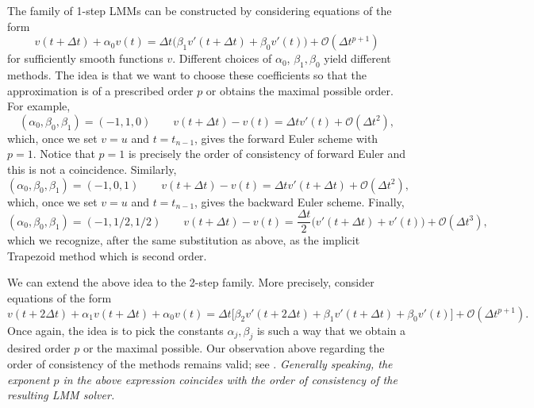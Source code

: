 The family of 1-step LMMs can be constructed by 
considering equations of the form 
\begin{equation*}
    v(t + \Delta t) + \alpha_0 v(t) 
    = \Delta t \Big( \beta_1 v'(t + \Delta t) + \beta_0 v'(t) \Big) 
    + \mathcal{O}(\Delta t^{p+1})
\end{equation*}
for sufficiently smooth functions $v$. Different choices of $\alpha_0$, 
$\beta_1, \beta_0$ yield different methods. The idea is that 
we want to choose these coefficients so that the approximation 
is of a prescribed order $p$ or obtains the maximal possible 
order. For example,
\begin{equation*}
    (\alpha_0, \beta_0, \beta_1) = (-1, 1, 0) \qquad 
    v(t + \Delta t) - v(t) = \Delta t v'(t) + \mathcal{O}(\Delta t^{2}),
\end{equation*}
which, once we set $v = u$ and $t = t_{n-1}$, gives the forward Euler scheme with 
$p=1$. Notice that $p=1$ is precisely the order of consistency 
of forward Euler and this is not a coincidence. 
Similarly, 
\begin{equation*}
        (\alpha_0, \beta_0, \beta_1) = (-1, 0, 1) \qquad 
    v(t + \Delta t) - v(t) = \Delta t v'(t + \Delta t) 
    + \mathcal{O}(\Delta t^{2}),
\end{equation*}
which, once we set $v = u$ and $t = t_{n-1}$, gives the backward Euler scheme. 
Finally, 
\begin{equation*}
    (\alpha_0, \beta_0, \beta_1) = (-1, 1/2, 1/2) \qquad 
    v(t + \Delta t) - v(t) = 
    \frac{\Delta t}{2} \Big( v'(t+\Delta t) + v'(t) \Big)
    + \mathcal{O}(\Delta t^{3}),
\end{equation*}
which we recognize, after the same substitution as above, 
 as the implicit Trapezoid method which is second order. 

We can extend the above idea to the 2-step family. More precisely, 
consider equations of the form 
\begin{equation*}
    v(t + 2\Delta t) + \alpha_1 v(t + \Delta t) + \alpha_0 v(t)
    = \Delta t \Big[ \beta_2 v'(t + 2 \Delta t) 
    + \beta_1 v'(t + \Delta t) 
    + \beta_0 v'(t)  \Big] + \mathcal{O}(\Delta t^{p+ 1}).
\end{equation*}
Once again, the idea is to pick the constants $\alpha_j, \beta_j$ 
is such a way that we obtain a desired order $p$ or the maximal 
possible. Our observation above regarding the order 
of consistency of the methods remains valid; see 
\cite[Sec.~4]{griffiths2010numerical}. {\it Generally speaking, 
the exponent $p$ in the above expression coincides 
with the order of consistency of the resulting LMM solver.}

